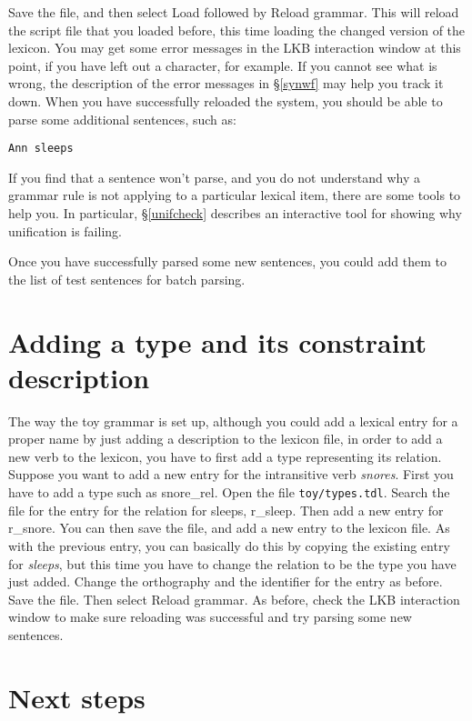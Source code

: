 \documentclass[12pt]{report}
\newcommand{\filename}[1]{{\tt #1}}
\newcommand{\lkbmenucommand}{{\bf}}
\begin{document}
Save the file, and then select {\lkbmenucommand Load}
followed by {\lkbmenucommand Reload grammar}.  This will reload the script file that
you loaded before, this time loading the changed version of the lexicon.
You may get some error messages in the LKB interaction window
at this point, if you have left
out a character, for example.  If you cannot see what is wrong, the
description of the error messages in \S\ref{synwf} may help you
track it down.  When you have successfully reloaded the system,
you should be able to parse some additional sentences, such as:
\begin{verbatim}
Ann sleeps
\end{verbatim}
If you find that a sentence won't parse, and you do not understand
why a grammar rule is not applying to a particular lexical
item, there are some tools to help you.  In particular,
\S\ref{unifcheck} describes an interactive tool for 
showing why unification is failing.

Once you have successfully parsed some new sentences,
you could add them to the list of test sentences for batch parsing.

\section{Adding a type and its constraint description}

The way the toy grammar is set up, although you could add a lexical
entry for a proper name by just adding a description to the lexicon file,
in order to add a new verb to the lexicon, you have to first add a type
representing its relation.  Suppose you want to add a new entry for
the intransitive verb {\it snores}.  First you have to add a type such as
{\type snore\_rel}.  Open the file \filename{toy/types.tdl}.  Search the file for
the entry for the relation for sleeps, {\type r\_sleep}.  Then add a new
entry for {\type r\_snore}.  You can then save the file, and add a new entry
to the lexicon file.  As with the previous entry, you can basically do
this by copying the existing entry for {\it sleeps},
but this time you have to 
change the relation to be the type you have just added.
Change the orthography and the identifier for the entry as before.
Save the file.  Then select {\lkbmenucommand Reload grammar}.  As before, check
the LKB interaction window to make sure reloading was successful 
and try parsing
some new sentences.


\section{Next steps}
\end{document}
